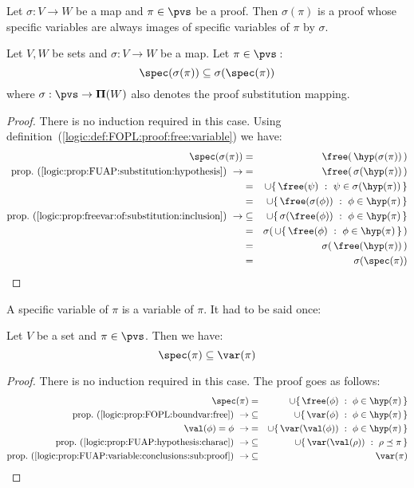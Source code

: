 Let $\sigma:V\to W$ be a map and $\pi\in\pvs$ be a proof. Then
$\sigma(\pi)$ is a proof whose specific variables are always images
of specific variables of $\pi$ by $\sigma$.

\begin{prop}\label{logic:prop:FUAP:freevar:substitution}
Let $V, W$ be sets and $\sigma:V\to W$ be a map. Let $\pi\in\pvs$\,:
    \[
    \spec(\sigma(\pi))\subseteq\sigma(\spec(\pi))
    \]
where $\sigma:\pvs\to{\bf\Pi}(W)$ also denotes the proof
substitution mapping.
\end{prop}
\begin{proof}
There is no induction required in this case. Using
definition~(\ref{logic:def:FOPL:proof:free:variable}) we have:
    \begin{eqnarray*}
    \spec(\sigma(\pi))&=&\free(\,\hyp(\sigma(\pi))\,)\\
    \mbox{prop.~(\ref{logic:prop:FUAP:substitution:hypothesis})}\ \rightarrow
    &=&\free(\,\sigma(\hyp(\pi))\,)\\
    &=&\cup\{\,\free(\psi)\ :\ \psi\in\sigma(\hyp(\pi))\,\}\\
    &=&\cup\{\,\free(\sigma(\phi))\ :\ \phi\in\hyp(\pi)\,\}\\
    \mbox{prop.~(\ref{logic:prop:freevar:of:substitution:inclusion})}\ \rightarrow
    &\subseteq&\cup\{\,\sigma(\free(\phi))\ :\ \phi\in\hyp(\pi)\,\}\\
    &=&\sigma(\,\cup\{\,\free(\phi)\ :\ \phi\in\hyp(\pi)\,\}\,)\\
    &=&\sigma(\,\free(\hyp(\pi))\,)\\
    &=&\sigma(\spec(\pi))
    \end{eqnarray*}
\end{proof}

A specific variable of $\pi$ is a variable of $\pi$. It had to be
said once:

\begin{prop}\label{logic:prop:FUAP:freevar:subset:variable}
Let $V$ be a set and $\pi\in\pvs$. Then we have:
    \[
    \spec(\pi)\subseteq\var(\pi)
    \]
\end{prop}
\begin{proof}
There is no induction required in this case. The proof goes as
follows:
    \begin{eqnarray*}
    \spec(\pi)&=&\cup\{\,\free(\phi)\ :\ \phi\in\hyp(\pi)\,\}\\
    \mbox{prop.~(\ref{logic:prop:FOPL:boundvar:free})}\ \rightarrow
    &\subseteq&\cup\{\,\var(\phi)\ :\ \phi\in\hyp(\pi)\,\}\\
    \val(\phi)=\phi\ \rightarrow
    &=&\cup\{\,\var(\val(\phi))\ :\ \phi\in\hyp(\pi)\,\}\\
    \mbox{prop.~(\ref{logic:prop:FUAP:hypothesis:charac})}\ \rightarrow
    &\subseteq&\cup\{\,\var(\val(\rho))\ :\ \rho\preceq\pi\,\}\\
    \mbox{prop.~(\ref{logic:prop:FUAP:variable:conclusions:sub:proof})}\ \rightarrow
    &\subseteq&\var(\pi)
    \end{eqnarray*}
\end{proof}
